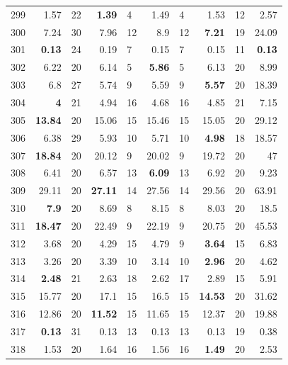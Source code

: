 \begin{longtable}{lr@{\hskip 4pt}l@{\hskip 12pt}r@{\hskip 4pt}l@{\hskip 12pt}r@{\hskip 4pt}l@{\hskip 12pt}r@{\hskip 4pt}l@{\hskip 12pt}r}
299 & 1.57 & 22 & \textbf{1.39} & 4 & 1.49 & 4 & 1.53 & 12 & 2.57 \\
300 & 7.24 & 30 & 7.96 & 12 & 8.9 & 12 & \textbf{7.21} & 19 & 24.09 \\
301 & \textbf{0.13} & 24 & 0.19 & 7 & 0.15 & 7 & 0.15 & 11 & \textbf{0.13} \\
302 & 6.22 & 20 & 6.14 & 5 & \textbf{5.86} & 5 & 6.13 & 20 & 8.99 \\
303 & 6.8 & 27 & 5.74 & 9 & 5.59 & 9 & \textbf{5.57} & 20 & 18.39 \\
304 & \textbf{4} & 21 & 4.94 & 16 & 4.68 & 16 & 4.85 & 21 & 7.15 \\
305 & \textbf{13.84} & 20 & 15.06 & 15 & 15.46 & 15 & 15.05 & 20 & 29.12 \\
306 & 6.38 & 29 & 5.93 & 10 & 5.71 & 10 & \textbf{4.98} & 18 & 18.57 \\
307 & \textbf{18.84} & 20 & 20.12 & 9 & 20.02 & 9 & 19.72 & 20 & 47 \\
308 & 6.41 & 20 & 6.57 & 13 & \textbf{6.09} & 13 & 6.92 & 20 & 9.23 \\
309 & 29.11 & 20 & \textbf{27.11} & 14 & 27.56 & 14 & 29.56 & 20 & 63.91 \\
310 & \textbf{7.9} & 20 & 8.69 & 8 & 8.15 & 8 & 8.03 & 20 & 18.5 \\
311 & \textbf{18.47} & 20 & 22.49 & 9 & 22.19 & 9 & 20.75 & 20 & 45.53 \\
312 & 3.68 & 20 & 4.29 & 15 & 4.79 & 9 & \textbf{3.64} & 15 & 6.83 \\
313 & 3.26 & 20 & 3.39 & 10 & 3.14 & 10 & \textbf{2.96} & 20 & 4.62 \\
314 & \textbf{2.48} & 21 & 2.63 & 18 & 2.62 & 17 & 2.89 & 15 & 5.91 \\
315 & 15.77 & 20 & 17.1 & 15 & 16.5 & 15 & \textbf{14.53} & 20 & 31.62 \\
316 & 12.86 & 20 & \textbf{11.52} & 15 & 11.65 & 15 & 12.37 & 20 & 19.88 \\
317 & \textbf{0.13} & 31 & 0.13 & 13 & 0.13 & 13 & 0.13 & 19 & 0.38 \\
318 & 1.53 & 20 & 1.64 & 16 & 1.56 & 16 & \textbf{1.49} & 20 & 2.53 \\
\bottomrule
\end{longtable}